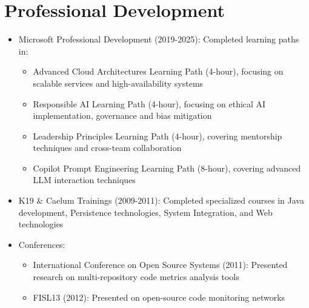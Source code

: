 
\section{Professional Development}
\begin{itemize}
    \item \small{Microsoft Professional Development (2019-2025):}
          \footnotesize{Completed learning paths in:}
          \begin{itemize}[itemsep=1pt, parsep=0pt]
              \item \footnotesize{Advanced Cloud Architectures Learning Path (4-hour), focusing on scalable \lowercase{\BackEndWriting} services and high-availability systems}
              \item \footnotesize{Responsible AI Learning Path (4-hour), focusing on ethical AI implementation, governance and bias mitigation}
              \item \footnotesize{Leadership Principles Learning Path (4-hour), covering mentorship techniques and cross-team collaboration}
              \item \footnotesize{Copilot Prompt Engineering Learning Path (8-hour), covering advanced LLM interaction techniques}
          \end{itemize}
    \item \small{K19 \& Caelum Trainings (2009-2011):} \footnotesize{Completed specialized courses in Java development, Persistence technologies, System Integration, and Web technologies}
    \item \small{Conferences:}
          \begin{itemize}[itemsep=1pt, parsep=0pt]
              \item \footnotesize{International Conference on Open Source Systems (2011): Presented research on multi-repository code metrics analysis tools}
              \item \footnotesize{FISL13 (2012): Presented on open-source code monitoring networks}
          \end{itemize}
\end{itemize}